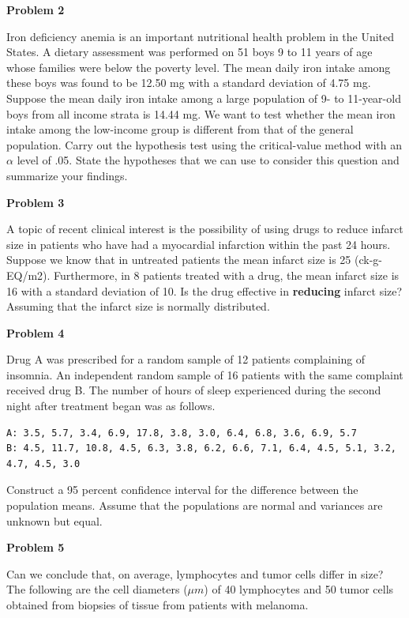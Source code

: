 \documentclass[
]{book}
\begin{document}
\textbf{Problem 2}

Iron deficiency anemia is an important nutritional health problem in the United States. A dietary assessment was performed on 51 boys 9 to 11 years of age whose families were below the poverty level. The mean daily iron intake among these boys was found to be 12.50 mg with a standard deviation of 4.75 mg. Suppose the mean daily iron intake among a large population of 9- to 11-year-old boys from all income strata is 14.44 mg. We want to test whether the mean iron intake among the low-income group is different from that of the general population. Carry out the hypothesis test using the critical-value method with an \(\alpha\) level of .05. State the hypotheses that we can use to consider this question and summarize your findings.

\textbf{Problem 3}

A topic of recent clinical interest is the possibility of using drugs to reduce infarct size in patients who have had a myocardial infarction within the past 24 hours. Suppose we know that in untreated patients the mean infarct size is 25 (ck-g-EQ/m2). Furthermore, in 8 patients treated with a drug, the mean infarct size is 16 with a standard deviation of 10. Is the drug effective in \textbf{reducing} infarct size? Assuming that the infarct size is normally distributed.

\textbf{Problem 4}

Drug A was prescribed for a random sample of 12 patients complaining of insomnia. An independent random sample of 16 patients with the same complaint received drug B. The number of hours of sleep experienced during the second night after treatment began was as follows.

\begin{verbatim}
A: 3.5, 5.7, 3.4, 6.9, 17.8, 3.8, 3.0, 6.4, 6.8, 3.6, 6.9, 5.7
B: 4.5, 11.7, 10.8, 4.5, 6.3, 3.8, 6.2, 6.6, 7.1, 6.4, 4.5, 5.1, 3.2, 4.7, 4.5, 3.0
\end{verbatim}

Construct a 95 percent confidence interval for the difference between the population means. Assume that the populations are normal and variances are unknown but equal.

\textbf{Problem 5}

Can we conclude that, on average, lymphocytes and tumor cells differ in size? The following are the cell diameters (\(\mu m\)) of 40 lymphocytes and 50 tumor cells obtained from biopsies of tissue from patients with melanoma.
\end{document}
